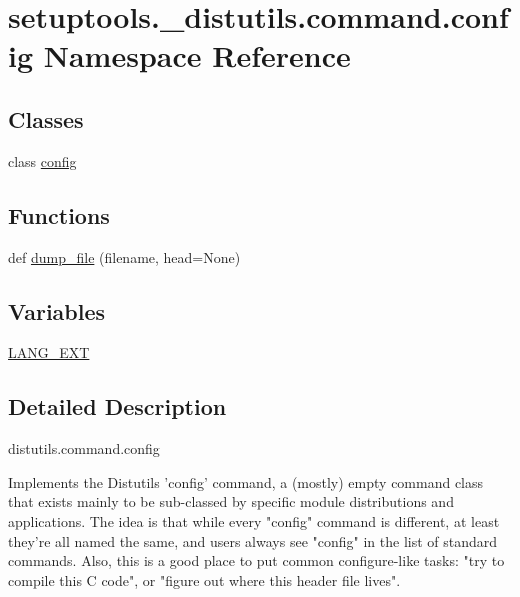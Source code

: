 \hypertarget{namespacesetuptools_1_1__distutils_1_1command_1_1config}{}\section{setuptools.\+\_\+distutils.\+command.\+config Namespace Reference}
\label{namespacesetuptools_1_1__distutils_1_1command_1_1config}
\subsection*{Classes}
\begin{DoxyCompactItemize}
\item 
class \hyperlink{classsetuptools_1_1__distutils_1_1command_1_1config_1_1config}{config}
\end{DoxyCompactItemize}
\subsection*{Functions}
\begin{DoxyCompactItemize}
\item 
def \hyperlink{namespacesetuptools_1_1__distutils_1_1command_1_1config_a14d629feb642a36dfbbca61817af59a2}{dump\+\_\+file} (filename, head=None)
\end{DoxyCompactItemize}
\subsection*{Variables}
\begin{DoxyCompactItemize}
\item 
\hyperlink{namespacesetuptools_1_1__distutils_1_1command_1_1config_a6e35ebeaa6bebe3441072fdc891750f4}{L\+A\+N\+G\+\_\+\+E\+XT}
\end{DoxyCompactItemize}


\subsection{Detailed Description}
\begin{DoxyVerb}distutils.command.config

Implements the Distutils 'config' command, a (mostly) empty command class
that exists mainly to be sub-classed by specific module distributions and
applications.  The idea is that while every "config" command is different,
at least they're all named the same, and users always see "config" in the
list of standard commands.  Also, this is a good place to put common
configure-like tasks: "try to compile this C code", or "figure out where
this header file lives".
\end{DoxyVerb}
 

